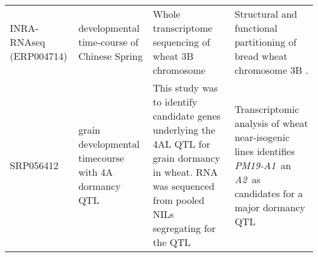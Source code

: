 \begin{sidewaystable}
\begin{tabular}{p{2cm}p{3cm}p{7.4cm}p{10.1cm}}
  INRA-RNAseq (ERP004714) & developmental time-course of Chinese Spring & Whole transcriptome sequencing of wheat 3B chromosome  & Structural and functional partitioning of bread wheat chromosome 3B \citep{Choulet2014}. \\
 SRP056412 & grain developmental timecourse with 4A dormancy QTL & This study was to identify candidate genes underlying the 4AL QTL for grain dormancy in wheat. RNA was sequenced from pooled NILs segregating for the QTL & Transcriptomic analysis of wheat near-isogenic lines identifies  \textit{PM19-A1} an \textit{A2} as candidates for a major dormancy QTL \citep{Barrero2015} \\
\bottomrule
\end{tabular}
\end{sidewaystable}
